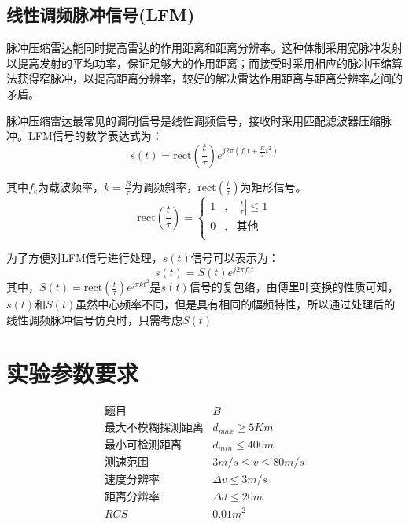 \documentclass[12pt]{article}
\begin{document}
\subsection{线性调频脉冲信号(LFM)}
脉冲压缩雷达能同时提高雷达的作用距离和距离分辨率。这种体制采用宽脉冲发射以提高发射的平均功率，保证足够大的作用距离；而接受时采用相应的脉冲压缩算法获得窄脉冲，以提高距离分辨率，较好的解决雷达作用距离与距离分辨率之间的矛盾。\par
脉冲压缩雷达最常见的调制信号是线性调频信号，接收时采用匹配滤波器压缩脉冲。LFM信号的数学表达式为：
\begin{equation}\label{LFMbiaodashi}
  s(t)=\mbox{rect}(\frac{t}{\tau})e^{j2\pi(f_c t+\frac{K}{2}t^2)}
\end{equation}\par
其中$f_c$为载波频率，$k=\frac{B}{\tau}$为调频斜率，rect$(\frac{t}{\tau})$为矩形信号。
\begin{equation}\label{juxingxinhao}
  \mbox{rect}(\frac{t}{\tau})=\left\{
  \begin{array}{lll}
1&,&|\frac{t}{\tau}|\leq 1\\
0&,&\mbox{其他}\\
  \end{array}
  \right.
\end{equation}\par
为了方便对LFM信号进行处理，$s(t)$信号可以表示为：
\begin{equation}\label{chongxie}
  s(t)=S(t)e^{j2\pi f_c t}
\end{equation}
其中，$S(t)=\mbox{rect}(\frac{t}{\tau}) e^{j\pi kt^2 }$是$s(t)$信号的复包络，由傅里叶变换的性质可知，$s(t)$和$S(t)$虽然中心频率不同，但是具有相同的幅频特性，所以通过处理后的线性调频脉冲信号仿真时，只需考虑$S(t)$
\section{实验参数要求}
\setcounter{table}{0}\setcounter{figure}{0}\setcounter{equation}{0}
\begin{equation}\label{yaoqiu}
  \begin{array}{ll}
    \mbox{题目}&B\\
\mbox{最大不模糊探测距离}&d_{max}\geq5Km\\
\mbox{最小可检测距离}&d_{min}\leq400m\\
\mbox{测速范围}&3m/s\leq v\leq 80m/s\\
\mbox{速度分辨率}&\Delta v\leq 3m/s\\
\mbox{距离分辨率}&\Delta d \leq 20m\\
RCS&0.01m^2\\
  \end{array}
\end{equation}
\end{document}
